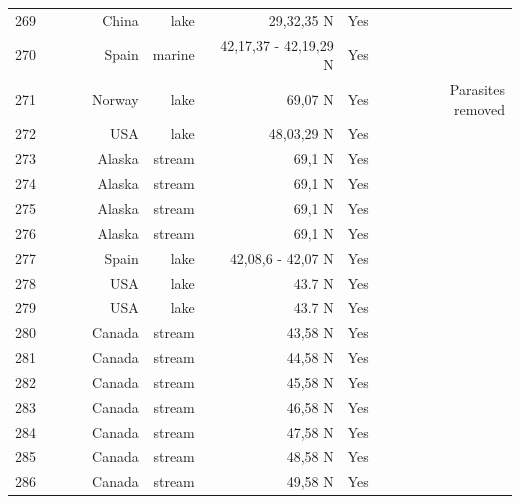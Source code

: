 \documentclass[12pt]{article}
\begin{document}
\begin{landscape}
\begin{table}[h!]
\begin{tabular}{rrrrrrrrr}
      269   & ~\citet{GlobalWeb} & ~\citet{Liu2007} & China & lake  & 29,32,35 N & Yes   &       &  \\
      270   & ~\citet{GlobalWeb} & ~\citet{Filguera2011} & Spain & marine & 42,17,37 - 42,19,29 N & Yes   &       &  \\
      271   & ~\citet{GlobalWeb} & ~\citet{Amundsen2013} & Norway & lake  & 69,07 N & Yes   &       & Parasites removed \\
      272   & ~\citet{GlobalWeb} & ~\citet{Hampton2011} & USA   & lake  & 48,03,29 N & Yes   &       &  \\
      273   & ~\citet{GlobalWeb} & ~\citet{Parker2006} & Alaska & stream & 69,1 N & Yes   &       &  \\
      274   & ~\citet{GlobalWeb} & ~\citet{Parker2006} & Alaska & stream & 69,1 N & Yes   &       &  \\
      275   & ~\citet{GlobalWeb} & ~\citet{Parker2006} & Alaska & stream & 69,1 N & Yes   &       &  \\
      276   & ~\citet{GlobalWeb} & ~\citet{Parker2006} & Alaska & stream & 69,1 N & Yes   &       &  \\
      277   & ~\citet{GlobalWeb} & ~\citet{Massana1996} & Spain & lake  & 42,08,6 - 42,07 N & Yes   &       &  \\
      278   & ~\citet{GlobalWeb} & ~\citet{Stewart2011} & USA   & lake  & 43.7 N & Yes   &       &  \\
      279   & ~\citet{GlobalWeb} & ~\citet{Stewart2011} & USA   & lake  & 43.7 N & Yes   &       &  \\
      280   & ~\citet{GlobalWeb} & ~\citet{Cromar1996} & Canada & stream & 43,58 N & Yes   &       &  \\
      281   & ~\citet{GlobalWeb} & ~\citet{Cromar1996} & Canada & stream & 44,58 N & Yes   &       &  \\
      282   & ~\citet{GlobalWeb} & ~\citet{Cromar1996} & Canada & stream & 45,58 N & Yes   &       &  \\
      283   & ~\citet{GlobalWeb} & ~\citet{Cromar1996} & Canada & stream & 46,58 N & Yes   &       &  \\
      284   & ~\citet{GlobalWeb} & ~\citet{Cromar1996} & Canada & stream & 47,58 N & Yes   &       &  \\
      285   & ~\citet{GlobalWeb} & ~\citet{Cromar1996} & Canada & stream & 48,58 N & Yes   &       &  \\
      286   & ~\citet{GlobalWeb} & ~\citet{Cromar1996} & Canada & stream & 49,58 N & Yes   &       &  \\

\end{tabular}
\end{table}
\end{landscape}
\end{document}
